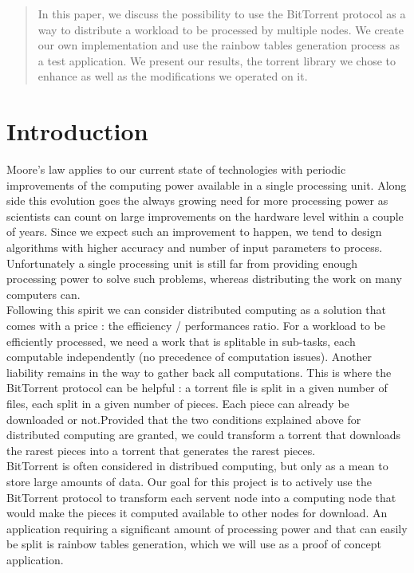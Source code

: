\documentclass[a4paper]{article}
\begin{document}
{\begin{abstract}
In this paper, we discuss the possibility to use the BitTorrent protocol as a way to distribute a workload to be processed by multiple nodes. We create our own implementation and use the rainbow tables generation process as a test application. We present our results, the torrent library we chose to enhance as well as the modifications we operated on it.
\end{abstract}
\vspace{2mm}

\section{Introduction}

Moore's law applies to our current state of technologies with periodic improvements of the computing power available in a single processing unit. Along side this evolution goes the always growing need for more processing power as scientists can count on large improvements on the hardware level within a couple of years. Since we expect such an improvement to happen, we tend to design algorithms with higher accuracy and number of input parameters to process. Unfortunately a single processing unit is still far from providing enough processing power to solve such problems, whereas distributing the work on many computers can.\\

Following this spirit we can consider distributed computing as a solution that comes with a price : the efficiency / performances ratio. For a workload to be efficiently processed, we need a work that is splitable in sub-tasks, each computable independently (no precedence of computation issues). Another liability remains in the way to gather back all computations. This is where the BitTorrent protocol can be helpful : a torrent file is split in a given number of files, each split in a given number of pieces. Each piece can already be downloaded or not.Provided that the two conditions explained above for distributed computing are granted, we could transform a torrent that downloads the rarest pieces into a torrent that generates the rarest pieces.\\

BitTorrent is often considered in distribued computing, but only as a mean to store large amounts of data. Our goal for this project is to actively use the BitTorrent protocol to transform each servent node into a computing node that would make the pieces it computed available to other nodes for download. An application requiring a significant amount of processing power and that can easily be split is rainbow tables generation, which we will use as a proof of concept application.\\

}
\end{document}
